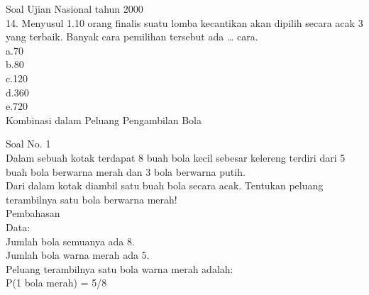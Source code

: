 \documentclass[11pt,fleqn]{book} %
\begin{document}
Soal Ujian Nasional tahun 2000\\
14. Menyusul 1.10 orang finalis suatu lomba kecantikan akan dipilih secara acak 3 yang terbaik. Banyak cara pemilihan tersebut ada … cara.\\

a.70\\

b.80\\

c.120\\

d.360\\

e.720\\


Kombinasi dalam Peluang Pengambilan Bola

Soal No. 1\\
Dalam sebuah kotak terdapat 8 buah bola kecil sebesar kelereng terdiri dari 5 buah bola berwarna merah dan 3 bola berwarna putih.\\
Dari dalam kotak diambil satu buah bola secara acak.
Tentukan peluang terambilnya satu bola berwarna merah!\\

Pembahasan\\
Data:\\
Jumlah bola semuanya ada 8.\\
Jumlah bola warna merah ada 5.\\

Peluang terambilnya satu bola warna merah adalah:\\
P(1 bola merah) = 5/8 \\
\end{document}
